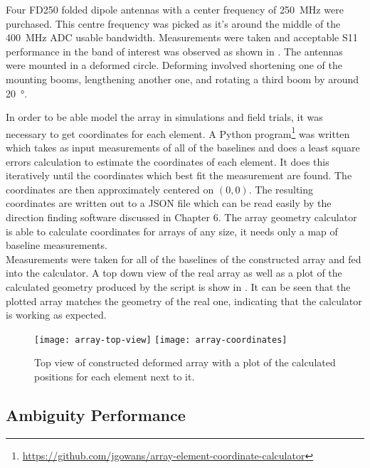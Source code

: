 Four FD250 folded dipole antennas with a center frequency of \SI{250}{\mega\hertz} were purchased. This centre frequency was picked as it's around the middle of the \SI{400}{\mega\hertz} ADC usable bandwidth. Measurements were taken and acceptable S11 performance in the band of interest was observed as shown in .
The antennas were mounted in a deformed circle. Deforming involved shortening one of the mounting booms, lengthening another one, and rotating a third boom by around \SI{20}{\degree}. 

In order to be able model the array in simulations and field trials, it was necessary to get coordinates for each element. A Python program\footnote{\url{https://github.com/jgowans/array-element-coordinate-calculator}} was written which takes as input measurements of all of the baselines and does a least square errors calculation to estimate the coordinates of each element. It does this iteratively until the coordinates which best fit the measurement are found. The coordinates are then approximately centered on \((0,0)\). The resulting coordinates are written out to a JSON file which can be read easily by the direction finding software discussed in Chapter 6. The array geometry calculator is able to calculate coordinates for arrays of any size, it needs only a map of baseline measurements.\\

Measurements were taken for all of the baselines of the constructed array and fed into the calculator. A top down view of the real array as well as a plot of the calculated geometry produced by the script is show in . It can be seen that the plotted array matches the geometry of the real one, indicating that the calculator is working as expected.

\begin{figure}
  \texttt{[image: array-top-view]}
  \texttt{[image: array-coordinates]}
  \caption{Top view of constructed deformed array with a plot of the calculated positions for each element next to it.}
  \label{fig:rf-front-end:array-coordinates}
\end{figure}

\subsection{Ambiguity Performance}


